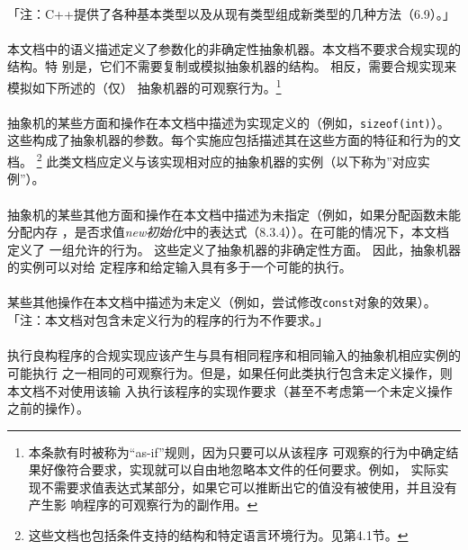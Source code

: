 \paragraph{}
「注：C++提供了各种基本类型以及从现有类型组成新类型的几种方法（6.9）。」


\paragraph{}
本文档中的语义描述定义了参数化的非确定性抽象机器。本文档不要求合规实现的结构。特
别是，它们不需要复制或模拟抽象机器的结构。 相反，需要合规实现来模拟如下所述的（仅）
抽象机器的可观察行为。\footnote{本条款有时被称为“as-if”规则，因为只要可以从该程序
可观察的行为中确定结果好像符合要求，实现就可以自由地忽略本文件的任何要求。例如，
实际实现不需要求值表达式某部分，如果它可以推断出它的值没有被使用，并且没有产生影
响程序的可观察行为的副作用。}

\paragraph{}
抽象机的某些方面和操作在本文档中描述为实现定义的（例如，\texttt{sizeof(int)}）。
这些构成了抽象机器的参数。每个实施应包括描述其在这些方面的特征和行为的文档。
\footnote{这些文档也包括条件支持的结构和特定语言环境行为。见第4.1节。}
此类文档应定义与该实现相对应的抽象机器的实例（以下称为”对应实例”）。

\paragraph{}
抽象机的某些其他方面和操作在本文档中描述为未指定（例如，如果分配函数未能分配内存
，是否求值\textit{new初始化}中的表达式（8.3.4））。在可能的情况下，本文档定义了
一组允许的行为。 这些定义了抽象机器的非确定性方面。 因此，抽象机器的实例可以对给
定程序和给定输入具有多于一个可能的执行。

\paragraph{}
某些其他操作在本文档中描述为未定义（例如，尝试修改\texttt{const}对象的效果）。
「注：本文档对包含未定义行为的程序的行为不作要求。」

\paragraph{}
执行良构程序的合规实现应该产生与具有相同程序和相同输入的抽象机相应实例的可能执行
之一相同的可观察行为。但是，如果任何此类执行包含未定义操作，则本文档不对使用该输
入执行该程序的实现作要求（甚至不考虑第一个未定义操作之前的操作）。

